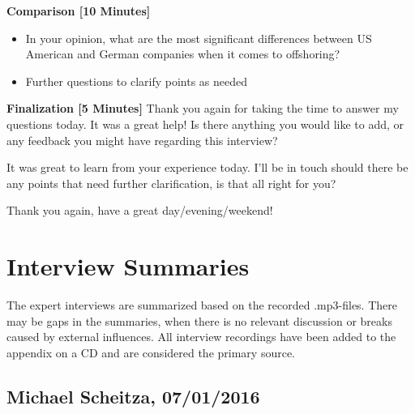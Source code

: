 \begin{appendix}
{\bf Comparison [10 Minutes]}
\begin{itemize}
	\item In your opinion, what are the most significant differences between US American and German companies when it comes to offshoring?
	\item Further questions to clarify points as needed
\end{itemize}

{\bf Finalization [5 Minutes]}
Thank you again for taking the time to answer my questions today. It was a great help! Is there anything you would like to add, or any feedback you might have regarding this interview?

It was great to learn from your experience today. I’ll be in touch should there be any points that need further clarification, is that all right for you?

Thank you again, have a great day/evening/weekend!


\tocless\section{Interview Summaries}
The expert interviews are summarized based on the recorded .mp3-files. There may be gaps in the summaries, when there is no relevant discussion or breaks caused by external influences. All interview recordings have been added to the appendix on a CD and are considered the primary source.

\tocless\subsection{Michael Scheitza, 07/01/2016}


\end{appendix}
